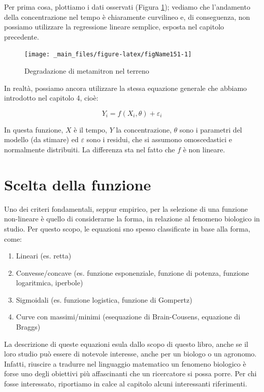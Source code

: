 \documentclass[a4paper,12pt,oneside]{book}
\providecommand{\tightlist}{%
  \setlength{\itemsep}{0pt}\setlength{\parskip}{0pt}}
\begin{document}
Per prima cosa, plottiamo i dati osservati (Figura \ref{fig:figName151}); vediamo che l'andamento della concentrazione nel tempo è chiaramente curvilineo e, di conseguenza, non possiamo utilizzare la regressione lineare semplice, esposta nel capitolo precedente.

\begin{figure}

{\centering \texttt{[image: \_main\_files/figure-latex/figName151-1]} 

}

\caption{Degradazione di metamitron nel terreno}\label{fig:figName151}
\end{figure}

In realtà, possiamo ancora utilizzare la stessa equazione generale che abbiamo introdotto nel capitolo 4, cioè:

\[ Y_i = f(X_i, \theta) + \varepsilon_i \]

In questa funzione, \(X\) è il tempo, \(Y\) la concentrazione, \(\theta\) sono i parametri del modello (da stimare) ed \(\varepsilon\) sono i residui, che si assumono omoscedastici e normalmente distribuiti. La differenza sta nel fatto che \(f\) è non lineare.

\hypertarget{scelta-della-funzione}{%
\section{Scelta della funzione}\label{scelta-della-funzione}}

Uno dei criteri fondamentali, seppur empirico, per la selezione di una funzione non-lineare è quello di considerarne la forma, in relazione al fenomeno biologico in studio. Per questo scopo, le equazioni sno spesso classificate in base alla forma, come:

\begin{enumerate}
\def\labelenumi{\arabic{enumi}.}
\tightlist
\item
  Lineari (es. retta)
\item
  Convesse/concave (es. funzione esponenziale, funzione di potenza, funzione logaritmica, iperbole)
\item
  Sigmoidali (es. funzione logistica, funzione di Gompertz)
\item
  Curve con massimi/minimi (esequazione di Brain-Cousens, equazione di Braggs)
\end{enumerate}

La descrizione di queste equazioni esula dallo scopo di questo libro, anche se il loro studio può essere di notevole interesse, anche per un biologo o un agronomo. Infatti, riuscire a tradurre nel linguaggio matematico un fenomeno biologico è forse uno degli obiettivi più affascinanti che un ricercatore si possa porre. Per chi fosse interessato, riportiamo in calce al capitolo alcuni interessanti riferimenti.
\end{document}
